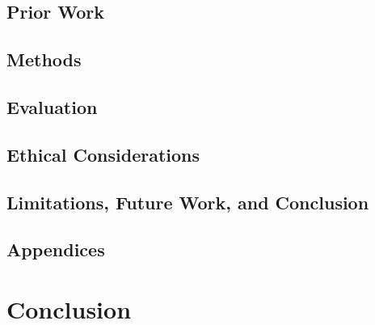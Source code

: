 \documentclass[10pt,twocolumn]{article}
\begin{document}
\subsection{Prior Work}

\subsection{Methods}

\subsection{Evaluation}

\subsection{Ethical Considerations}

\subsection{Limitations, Future Work, and Conclusion}

\subsection{Appendices}

\section{Conclusion}

\printbibliography 
\end{document}
